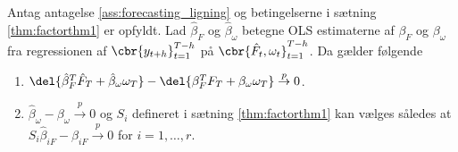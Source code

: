 \begin{thm} \label{thm:factorthm2}
Antag antagelse \ref{ass:forecasting_ligning} og betingelserne i sætning \ref{thm:factorthm1} er opfyldt. 
Lad \(\hat{\beta}_F\) og \(\hat{\beta}_\omega\) betegne OLS estimaterne af \(\beta_F\) og \(\beta_\omega\) fra regressionen af \(\cbr{y_{t+h}}_{t=1}^{T-h}\) på \(\cbr{\hat{F}_t, \omega_t}_{t=1}^{T-h}\). Da gælder følgende
\begin{enumerate}
\item \(\del{\hat{\beta}_F^T \hat{F}_T + \hat{\beta}_\omega \omega_T} - \del{\beta_F^T F_T + \beta_\omega \omega_T} \overset{p}{\rightarrow} 0\).
\item \(\hat{\beta}_\omega - \beta_\omega \overset{p}{\rightarrow} 0\) og \(S_i\) defineret i sætning \ref{thm:factorthm1} kan vælges således at \(S_i \hat{\beta}_{iF} - \beta_{iF} \overset{p}{\rightarrow} 0\) for \(i = 1, \ldots, r\).
\end{enumerate}
\end{thm}
%
